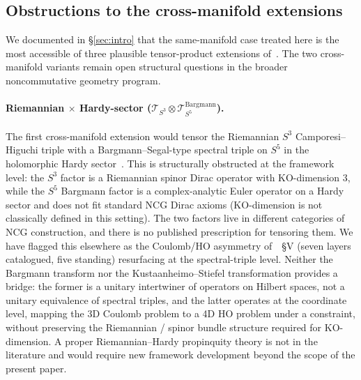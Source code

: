 \documentclass[11pt,a4paper]{article}
\theoremstyle{plain}
\theoremstyle{definition}
\newcommand{\sthree}{S^{3}}
\newcommand{\Tcal}{\mathcal{T}}
\begin{document}
\subsection{Obstructions to the cross-manifold extensions}
\label{sec:obstructions}

We documented in \S\ref{sec:intro} that the same-manifold case treated
here is the most accessible of three plausible tensor-product
extensions of~\cite{loutey_paper38}. The two cross-manifold variants
remain open structural questions in the broader noncommutative
geometry program.

\paragraph{Riemannian $\times$ Hardy-sector
($\Tcal_{\sthree} \otimes \Tcal_{S^5}^{\mathrm{Bargmann}}$).}
The first cross-manifold extension would tensor the Riemannian
$\sthree$ Camporesi--Higuchi triple with a Bargmann--Segal-type
spectral triple on $S^5$ in the holomorphic Hardy
sector~\cite{paper24}. This is structurally obstructed at the
framework level: the $\sthree$ factor is a Riemannian spinor Dirac
operator with KO-dimension $3$, while the $S^5$ Bargmann factor is
a complex-analytic Euler operator on a Hardy sector and
does not fit standard NCG Dirac axioms (KO-dimension is not
classically defined in this setting). The two factors live in
different categories of NCG construction, and there is no published
prescription for tensoring them. We have flagged this elsewhere as the
Coulomb/HO asymmetry of~\cite{paper24}~\S V (seven layers catalogued,
five standing) resurfacing at the spectral-triple level. Neither the Bargmann transform nor the
Kustaanheimo--Stiefel transformation provides a bridge: the former is
a unitary intertwiner of operators on Hilbert spaces, not a unitary
equivalence of spectral triples, and the latter operates at the
coordinate level, mapping the 3D Coulomb problem to a 4D HO problem
under a constraint, without preserving the Riemannian / spinor bundle
structure required for KO-dimension. A proper Riemannian--Hardy
propinquity theory is not in the literature and would require new
framework development beyond the scope of the present paper.
\end{document}
